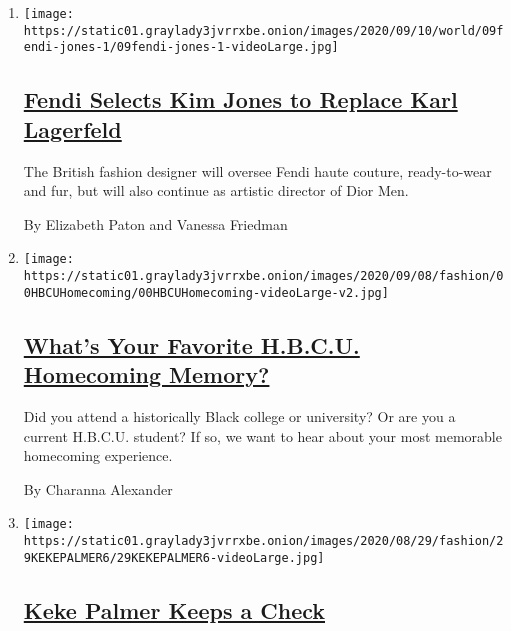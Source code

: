 \begin{enumerate}
\def\labelenumi{\arabic{enumi}.}
\item
  \texttt{[image: https://static01.graylady3jvrrxbe.onion/images/2020/09/10/world/09fendi-jones-1/09fendi-jones-1-videoLarge.jpg]}

  \hypertarget{fendi-selects-kim-jones-to-replace-karl-lagerfeld}{%
  \subsection{\texorpdfstring{\href{/2020/09/09/style/fendi-kim-jones-lagerfeld.html}{Fendi
  Selects Kim Jones to Replace Karl
  Lagerfeld}}{Fendi Selects Kim Jones to Replace Karl Lagerfeld}}\label{fendi-selects-kim-jones-to-replace-karl-lagerfeld}}

  The British fashion designer will oversee Fendi haute couture,
  ready-to-wear and fur, but will also continue as artistic director of
  Dior Men.

  By Elizabeth Paton and Vanessa Friedman
\item
  \texttt{[image: https://static01.graylady3jvrrxbe.onion/images/2020/09/08/fashion/00HBCUHomecoming/00HBCUHomecoming-videoLarge-v2.jpg]}

  \hypertarget{whats-your-favorite-hbcu-homecoming-memory}{%
  \subsection{\texorpdfstring{\href{/2020/09/10/style/whats-your-favorite-hbcu-homecoming-memory.html}{What's
  Your Favorite H.B.C.U. Homecoming
  Memory?}}{What's Your Favorite H.B.C.U. Homecoming Memory?}}\label{whats-your-favorite-hbcu-homecoming-memory}}

  Did you attend a historically Black college or university? Or are you
  a current H.B.C.U. student? If so, we want to hear about your most
  memorable homecoming experience.

  By Charanna Alexander
\item
  \texttt{[image: https://static01.graylady3jvrrxbe.onion/images/2020/08/29/fashion/29KEKEPALMER6/29KEKEPALMER6-videoLarge.jpg]}

  \hypertarget{keke-palmer-keeps-a-check}{%
  \subsection{\texorpdfstring{\href{/2020/08/28/style/keke-palmer-MTV-VMAs.html}{Keke
  Palmer Keeps a
  Check}}{Keke Palmer Keeps a Check}}\label{keke-palmer-keeps-a-check}}


\end{enumerate}
